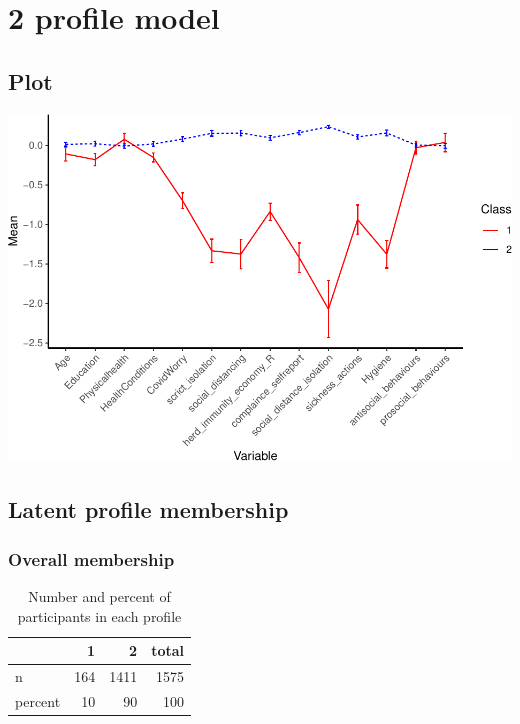 \documentclass[]{article}
\begin{document}
\newpage

\hypertarget{profile-model}{%
\section{2 profile model}\label{profile-model}}

\hypertarget{plot}{%
\subsection{Plot}\label{plot}}

\includegraphics{lpa_analyses_files/figure-latex/unnamed-chunk-5-1.pdf}

\hypertarget{latent-profile-membership}{%
\subsection{Latent profile membership}\label{latent-profile-membership}}

\hypertarget{overall-membership}{%
\subsubsection{Overall membership}\label{overall-membership}}

\begin{table}[H]

\caption{\label{tab:unnamed-chunk-6}Number and percent of participants in each profile}
\centering
\fontsize{6}{8}\selectfont
\begin{tabular}[t]{lrrr}
\toprule
  & 1 & 2 & total\\
\midrule
n & 164 & 1411 & 1575\\
percent & 10 & 90 & 100\\
\bottomrule
\end{tabular}
\end{table}
\end{document}
